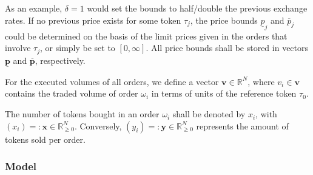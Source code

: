 \documentclass[11pt,parskip=full]{scrartcl}%
\begin{document}
As an example, $ \delta = 1 $ would set the bounds to half/double the previous exchange rates.
If no previous price exists for some token $ \tau_j $, the price bounds $ \underline{p}_j $
and $ \overline{p}_j $ could be determined on the basis of the limit prices given in the orders
that involve $ \tau_j $, or simply be set to $ [0,\infty] $.
All price bounds shall be stored in vectors $ \underline{\mathbf{p}} $ and $ \overline{\mathbf{p}}
$, respectively.

For the executed volumes of all orders, we define a vector $ \mathbf{v} \in \mathbb{R}^N $, where
$ v_i \in \mathbf{v} $ contains the traded volume of order $ \omega_i $ in terms of units of the
reference token $ \tau_0 $.

The number of tokens bought in an order $ \omega_i $ shall be denoted by $ x_i $, with
$ (x_i) =: \mathbf{x} \in \mathbb{R}^N_{\ge 0} $.
Conversely, $ (y_i) =: \mathbf{y} \in \mathbb{R}^N_{\ge 0} $ represents the amount of tokens sold
per order.

\subsubsection*{Model}
\end{document}
